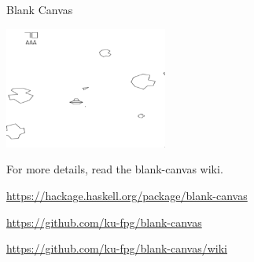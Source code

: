 \begin{hcarentry}[new]{Blank Canvas}
\begin{center}
\includegraphics[width=0.4\textwidth]{html/Blankeroids_Mark_Grebe.png}
\end{center}

For more details, read the blank-canvas wiki.

\FurtherReading
\begin{compactitem}
\item
  \url{https://hackage.haskell.org/package/blank-canvas}
\item
  \url{https://github.com/ku-fpg/blank-canvas}
\item
  \url{https://github.com/ku-fpg/blank-canvas/wiki}
\end{compactitem}
\end{hcarentry}
